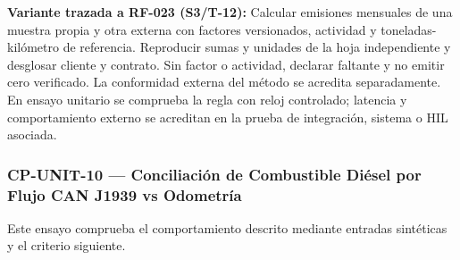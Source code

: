 \par\noindent\textbf{Variante trazada a RF-023 (S3/T-12):} Calcular emisiones mensuales de una muestra propia y otra externa con factores versionados, actividad y toneladas-kilómetro de referencia. Reproducir sumas y unidades de la hoja independiente y desglosar cliente y contrato. Sin factor o actividad, declarar faltante y no emitir cero verificado. La conformidad externa del método se acredita separadamente. En ensayo unitario se comprueba la regla con reloj controlado; latencia y comportamiento externo se acreditan en la prueba de integración, sistema o HIL asociada.\par
\subsubsection*{CP-UNIT-10 — Conciliación de Combustible Diésel por Flujo CAN J1939 vs Odometría}\label{sec:9-cp-unit-10}
Este ensayo comprueba el comportamiento descrito mediante entradas sintéticas y el criterio siguiente.

